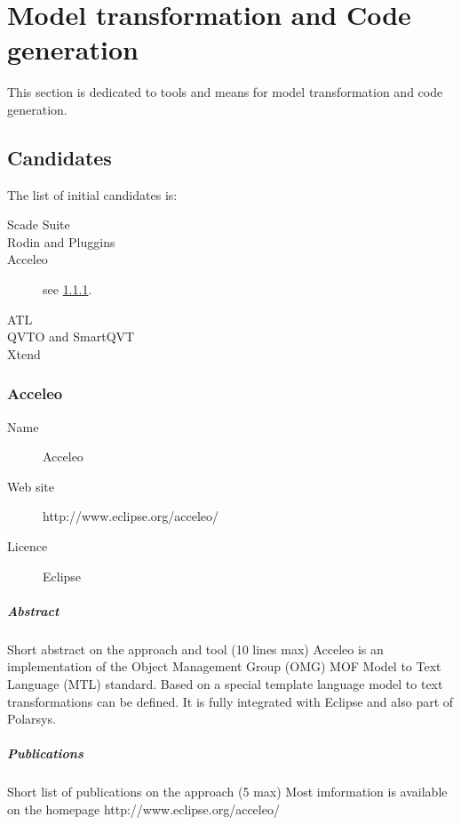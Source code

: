 

\chapter{Model transformation and Code generation}
\label{sec:transfo}

This section is dedicated to tools and means for model transformation and code generation.



\section{Candidates}


The list of initial candidates is:


\begin{description}
\item [Scade Suite]
\item [Rodin and Pluggins]
\item [Acceleo] see \ref{sec:Acceleo}.
\item [ATL]
\item [QVTO and SmartQVT]
\item [Xtend]
\end{description}



\subsection{Acceleo}
\label{sec:Acceleo}

\begin{description}
\item[Name] Acceleo
\item[Web site] http://www.eclipse.org/acceleo/
\item[Licence] Eclipse
\end{description}

\paragraph{Abstract} Short abstract on the approach and tool (10 lines max)
Acceleo is an implementation of the Object Management Group (OMG) MOF Model to Text Language (MTL) standard. Based on a special template language model to text transformations can be defined. It is fully integrated with Eclipse and also part of Polarsys.

\paragraph{Publications} Short list of publications on the approach (5 max)
Most imformation is available on the homepage http://www.eclipse.org/acceleo/



